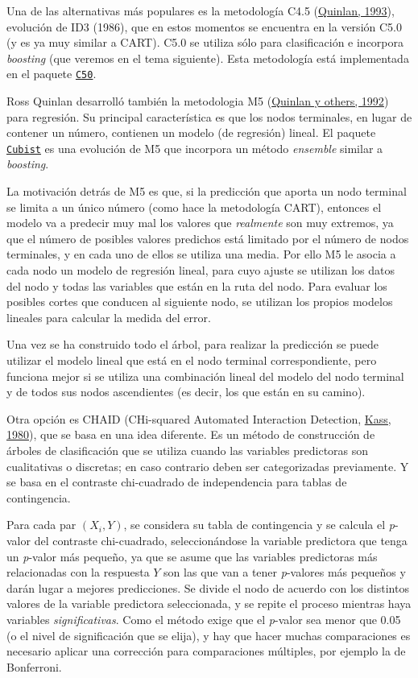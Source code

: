 \documentclass[
  spanish,
]{book}
\theoremstyle{break}
\theoremstyle{definition}
\theoremstyle{definition}
\theoremstyle{definition}
\theoremstyle{definition}
\theoremstyle{remark}
\begin{document}
Una de las alternativas más populares es la metodología C4.5 (\protect\hyperlink{ref-quinlan1993c4}{Quinlan, 1993}), evolución de ID3 (1986), que en estos momentos se encuentra en la versión C5.0 (y es ya muy similar a CART).
C5.0 se utiliza sólo para clasificación e incorpora \emph{boosting} (que veremos en el tema siguiente).
Esta metodología está implementada en el paquete \href{https://topepo.github.io/C5.0/index.html}{\texttt{C50}}.

Ross Quinlan desarrolló también la metodologia M5 (\protect\hyperlink{ref-quinlan1992learning}{Quinlan y others, 1992}) para regresión.
Su principal característica es que los nodos terminales, en lugar de contener un número, contienen un modelo (de regresión) lineal.
El paquete \href{https://topepo.github.io/Cubist}{\texttt{Cubist}} es una evolución de M5 que incorpora un método \emph{ensemble} similar a \emph{boosting}.

La motivación detrás de M5 es que, si la predicción que aporta un nodo terminal se limita a un único número (como hace la metodología CART), entonces el modelo va a predecir muy mal los valores que \emph{realmente} son muy extremos, ya que el número de posibles valores predichos está limitado por el número de nodos terminales, y en cada uno de ellos se utiliza una media.
Por ello M5 le asocia a cada nodo un modelo de regresión lineal, para cuyo ajuste se utilizan los datos del nodo y todas las variables que están en la ruta del nodo.
Para evaluar los posibles cortes que conducen al siguiente nodo, se utilizan los propios modelos lineales para calcular la medida del error.

Una vez se ha construido todo el árbol, para realizar la predicción se puede utilizar el modelo lineal que está en el nodo terminal correspondiente, pero funciona mejor si se utiliza una combinación lineal del modelo del nodo terminal y de todos sus nodos ascendientes (es decir, los que están en su camino).

Otra opción es CHAID (CHi-squared Automated Interaction Detection, \protect\hyperlink{ref-kass1980exploratory}{Kass, 1980}), que se basa en una idea diferente. Es un método de construcción de árboles de clasificación que se utiliza cuando las variables predictoras son cualitativas o discretas; en caso contrario deben ser categorizadas previamente.
Y se basa en el contraste chi-cuadrado de independencia para tablas de contingencia.

Para cada par \((X_i, Y)\), se considera su tabla de contingencia y se calcula el \emph{p}-valor del contraste chi-cuadrado, seleccionándose la variable predictora que tenga un \emph{p}-valor más pequeño, ya que se asume que las variables predictoras más relacionadas con la respuesta \(Y\) son las que van a tener \emph{p}-valores más pequeños y darán lugar a mejores predicciones.
Se divide el nodo de acuerdo con los distintos valores de la variable predictora seleccionada, y se repite el proceso mientras haya variables \emph{significativas}.
Como el método exige que el \emph{p}-valor sea menor que 0.05 (o el nivel de significación que se elija), y hay que hacer muchas comparaciones es necesario aplicar una corrección para comparaciones múltiples, por ejemplo la de Bonferroni.
\end{document}
